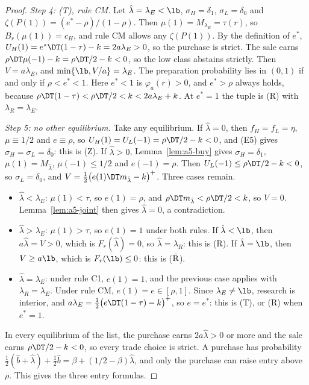 \begin{proof}
\emph{Step 4: (T), rule CM.} Let \(\hat\lambda=\lambda_E<\lb\), \(\sigma_H=\delta_1\), \(\sigma_L=\delta_0\) and
\(\zeta(P(1))=(e^*-\rho)/(1-\rho)\). Then \(\mu(1)=M_{\lambda_E}=\tau(r)\), so \(B_r(\mu(1))=c_H\), and rule CM
allows any \(\zeta(P(1))\). By the definition of \(e^*\), \(U_H(1)=e^*\DT(1-\tau)-k=2a\lambda_E>0\), so the purchase
is strict. The sale earns \(\rho\DT\mu(-1)-k=\rho\DT/2-k<0\), so the low class abstains strictly. Then \(V=a\lambda_E\), and \(\min\{\lb,V/a\}=\lambda_E\).
The preparation probability lies in \((0,1)\) if and only if \(\rho<e^*<1\). Here \(e^*<1\) is \(\varphi_a(r)>0\), and
\(e^*>\rho\) always holds, because \(\rho\DT(1-\tau)<\rho\DT/2<k<2a\lambda_E+k\). At \(e^*=1\) the tuple is (R)
with \(\lambda_R=\lambda_E\).

\emph{Step 5: no other equilibrium.} Take any equilibrium. If \(\hat\lambda=0\), then \(f_H=f_L=\eta\),
\(\mu\equiv1/2\) and \(e\equiv\rho\), so \(U_H(1)=U_L(-1)=\rho\DT/2-k<0\), and (E5) gives
\(\sigma_H=\sigma_L=\delta_0\): this is (Z). If \(\hat\lambda>0\), Lemma~\ref{lem:a5-buy} gives \(\sigma_H=\delta_1\),
\(\mu(1)=M_{\hat\lambda}\), \(\mu(-1)\le1/2\) and \(e(-1)=\rho\). Then \(U_L(-1)\le\rho\DT/2-k<0\), so
\(\sigma_L=\delta_0\), and \(V=\tfrac12\bigl(e(1)\DT m_{\hat\lambda}-k\bigr)^+\). Three cases remain.
\begin{itemize}[leftmargin=2em]
\item \(\hat\lambda<\lambda_E\): \(\mu(1)<\tau\), so \(e(1)=\rho\), and \(\rho\DT m_{\hat\lambda}<\rho\DT/2<k\), so
\(V=0\). Lemma~\ref{lem:a5-joint} then gives \(\hat\lambda=0\), a contradiction.
\item \(\hat\lambda>\lambda_E\): \(\mu(1)>\tau\), so \(e(1)=1\) under both rules. If \(\hat\lambda<\lb\), then
\(a\hat\lambda=V>0\), which is \(F_r(\hat\lambda)=0\), so \(\hat\lambda=\lambda_R\): this is (R). If
\(\hat\lambda=\lb\), then \(V\ge a\lb\), which is \(F_r(\lb)\le0\): this is (\(\bar{\rm R}\)).
\item \(\hat\lambda=\lambda_E\): under rule C1, \(e(1)=1\), and the previous case applies with \(\lambda_R=\lambda_E\).
Under rule CM, \(e(1)=e\in[\rho,1]\). Since \(\lambda_E\ne\lb\), research is interior, and
\(a\lambda_E=\tfrac12\bigl(e\DT(1-\tau)-k\bigr)^+\), so \(e=e^*\): this is (T), or (R) when \(e^*=1\).
\end{itemize}
In every equilibrium of the list, the purchase earns \(2a\hat\lambda>0\) or more and the sale earns \(\rho\DT/2-k<0\),
so every trade choice is strict. A purchase has probability
\(\tfrac12(\hat b+\hat\lambda)+\tfrac12\hat b=\beta+(1/2-\beta)\hat\lambda\), and only the purchase can raise entry
above \(\rho\). This gives the three entry formulas.
\end{proof}

